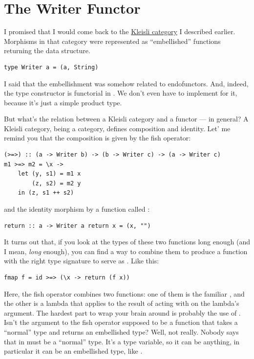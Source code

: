 \section{The Writer Functor}\label{the-writer-functor}

I promised that I would come back to the \hyperref[kleisli-categories-page]{Kleisli
category} I described earlier. Morphisms in that category were
represented as ``embellished'' functions returning the 
data structure.

\begin{Verbatim}[commandchars=\\\{\}]
type Writer a = (a, String)
\end{Verbatim}
I said that the embellishment was somehow related to endofunctors. And,
indeed, the  type constructor is functorial in
. We don't even have to implement  for it,
because it's just a simple product type.

But what's the relation between a Kleisli category and a functor --- in
general? A Kleisli category, being a category, defines composition and
identity. Let' me remind you that the composition is given by the fish
operator:

\begin{Verbatim}
(>=>) :: (a -> Writer b) -> (b -> Writer c) -> (a -> Writer c)
m1 >=> m2 = \x ->
    let (y, s1) = m1 x
        (z, s2) = m2 y 
    in (z, s1 ++ s2)
\end{Verbatim}
and the identity morphism by a function called :

\begin{Verbatim}[commandchars=\\\{\}]
return :: a -> Writer a return x = (x, "")
\end{Verbatim}
It turns out that, if you look at the types of these two functions long
enough (and I mean, \emph{long} enough), you can find a way to combine
them to produce a function with the right type signature to serve as
. Like this:

\begin{Verbatim}
fmap f = id >=> (\x -> return (f x))
\end{Verbatim}
Here, the fish operator combines two functions: one of them is the
familiar , and the other is a lambda that applies
 to the result of acting with  on the lambda's
argument. The hardest part to wrap your brain around is probably the use
of . Isn't the argument to the fish operator supposed to be a
function that takes a ``normal'' type and returns an embellished type?
Well, not really. Nobody says that  in
 must be a ``normal'' type. It's a
type variable, so it can be anything, in particular it can be an
embellished type, like .


